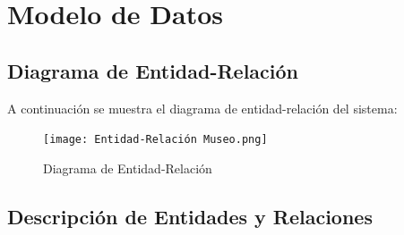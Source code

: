 \documentclass{report}
\begin{document}
\newpage

\section{Modelo de Datos}
\subsection*{Diagrama de Entidad-Relación}

A continuación se muestra el diagrama de entidad-relación del sistema:

\begin{figure}[H]
    \centering
    \texttt{[image: Entidad-Relación Museo.png]}
    \caption{Diagrama de Entidad-Relación}
\end{figure}

\subsection*{Descripción de Entidades y Relaciones}
\end{document}
